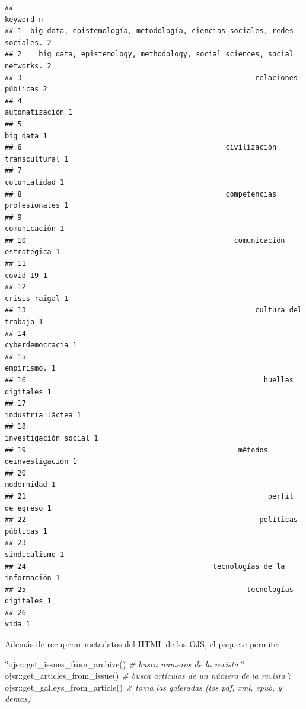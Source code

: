 \documentclass[
]{book}
\newenvironment{Shaded}{\begin{snugshade}}{\end{snugshade}}
\newcommand{\CommentTok}[1]{\textcolor[rgb]{0.56,0.35,0.01}{\textit{#1}}}
\newcommand{\FunctionTok}[1]{\textcolor[rgb]{0.00,0.00,0.00}{#1}}
\newcommand{\NormalTok}[1]{#1}
\newcommand{\SpecialCharTok}[1]{\textcolor[rgb]{0.00,0.00,0.00}{#1}}
\begin{document}
\begin{verbatim}
##                                                                     keyword n
## 1  big data, epistemología, metodología, ciencias sociales, redes sociales. 2
## 2    big data, epistemology, methodology, social sciences, social networks. 2
## 3                                                       relaciones públicas 2
## 4                                                            automatización 1
## 5                                                                  big data 1
## 6                                                civilización transcultural 1
## 7                                                              colonialidad 1
## 8                                                competencias profesionales 1
## 9                                                              comunicación 1
## 10                                                 comunicación estratégica 1
## 11                                                                 covid-19 1
## 12                                                            crisis raigal 1
## 13                                                      cultura del trabajo 1
## 14                                                          cyberdemocracia 1
## 15                                                               empirismo. 1
## 16                                                        huellas digitales 1
## 17                                                         industria láctea 1
## 18                                                     investigación social 1
## 19                                                  métodos deinvestigación 1
## 20                                                               modernidad 1
## 21                                                         perfil de egreso 1
## 22                                                       políticas públicas 1
## 23                                                             sindicalismo 1
## 24                                            tecnologías de la información 1
## 25                                                    tecnologías digitales 1
## 26                                                                     vida 1
\end{verbatim}

Además de recuperar metadatos del HTML de los OJS, el paquete permite:

\begin{Shaded}
\begin{Highlighting}[]
\NormalTok{?ojsr}\SpecialCharTok{::}\FunctionTok{get\_issues\_from\_archive}\NormalTok{() }\CommentTok{\# busca numeros de la revista}
\NormalTok{?ojsr}\SpecialCharTok{::}\FunctionTok{get\_articles\_from\_issue}\NormalTok{() }\CommentTok{\# busca artículos de un número de la revista}
\NormalTok{?ojsr}\SpecialCharTok{::}\FunctionTok{get\_galleys\_from\_article}\NormalTok{() }\CommentTok{\# toma las galeradas (los pdf, xml, epub, y demas)}
\end{Highlighting}
\end{Shaded}
\end{document}
